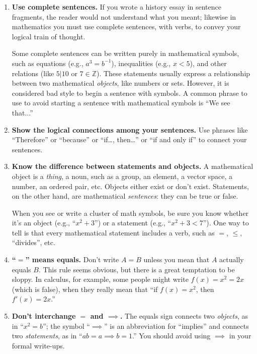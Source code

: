 \documentclass[11pt]{article}
\begin{document}
\begin{enumerate}
\item \textbf{Use complete sentences.}
        If you wrote a history essay in sentence fragments,
        the reader would not understand what you meant;
        likewise in mathematics you must use complete sentences, with verbs,
        to convey your logical train of thought.
        
        Some complete sentences can be written purely in mathematical symbols, 
        such as 
          equations (e.g., $a^3=b^{-1}$),
          inequalities (e.g., $x<5$),
          and other relations (like $5\big|10$ or $7\in\mathbb{Z}$).
        These statements usually express a relationship between two mathematical \emph{objects},
        like numbers or sets.  However, it is considered bad style to begin a sentence with symbols.  A common phrase to use to avoid starting a sentence with mathematical symbols is ``We see that...''

\item \textbf{Show the logical connections among your sentences.}
        Use phrases like ``Therefore'' or ``because'' or ``if\ldots, then\ldots''
        or ``if and only if'' to connect your sentences.
  
\item \textbf{Know the difference between statements and objects.}
        A mathematical object is a \emph{thing}, a noun,
        such as a group, an element, a vector space, a number, an ordered pair, etc.
        Objects either exist or don't exist.
        Statements, on the other hand, are mathematical \emph{sentences}:  they can be true or false.
        
        When you see or write a cluster of math symbols, be sure you know 
        whether it's an object (e.g., ``$x^2+3$'') or a statement (e.g., ``$x^2+3<7$'').
        One way to tell is that every mathematical statement includes a verb, such as
        $=$, $\leq$, ``divides'', etc.
        
\item \textbf{``$=$'' means equals.}
        Don't write $A=B$ unless you mean that $A$ actually equals $B$.
        This rule seems obvious,
        but there is a great temptation to be sloppy.  In calculus, for example, some people might write $f(x)=x^{2}=2x$ (which is false), when they really mean that ``if $f(x)=x^{2}$, then $f'(x)=2x$.''

\item \textbf{Don't interchange ${=}$ and ${\implies}$.}
        The equals sign connects two \emph{objects}, as in ``$x^2=b$''; 
        the symbol ``$\implies$'' is an abbreviation for ``implies'' and connects two \emph{statements},
        as in ``$ab=a \implies b=1$.''  You should avoid using $\implies$ in your formal write-ups.


\end{enumerate}
\end{document}
